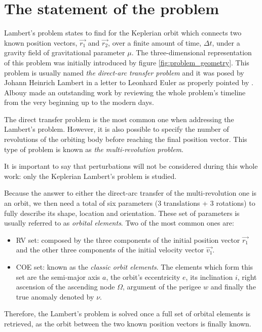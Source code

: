 \section{The statement of the problem}
\label{sec:statement}

Lambert's problem states to find for the Keplerian orbit which connects two
known position vectors, $\vec{r_{1}}$ and $\vec{r_{2}}$, over a finite amount of
time, $\Delta t$, under a gravity field of gravitational parameter $\mu$. The
three-dimensional representation of this problem was initially introduced by
figure \ref{fig:problem_geometry}. This problem is usually named \textit{the
  direct-arc transfer problem} and it was posed by Johann Heinrich Lambert in a
letter to Leonhard Euler as properly pointed by \cite{albouy2019}. Albouy made
an outstanding work by reviewing the whole problem's timeline from the very
beginning up to the modern days.

The direct transfer problem is the most common one when addressing the Lambert's
problem. However, it is also possible to specify the number of revolutions of
the orbiting body before reaching the final position vector. This type of
problem is known as \textit{the multi-revolution problem}.

It is important to say that perturbations will not be considered during this
whole work: only the Keplerian Lambert's problem is studied.

Because the answer to either the direct-arc transfer of the multi-revolution one
is an orbit, we then need a total of six parameters (3 translations + 3
rotations) to fully describe its shape, location and orientation. These set of
parameters is usually referred to as \textit{orbital elements}. Two of the most
common ones are:

\begin{itemize}
  \item RV set: composed by the three components of the initial position
        vector $\vec{r_{1}}$ and the other three components of the
        initial velocity vector $\vec{v_{1}}$.
  \item COE set: known as the \textit{classic orbit elements}. The
        elements which form this set are the semi-major axis $a$, the
        orbit's eccentricity $e$, its inclination $i$, right ascension
        of the ascending node $\Omega$, argument of the perigee $w$ and
        finally the true anomaly denoted by $\nu$.
\end{itemize}

Therefore, the Lambert's problem is solved once a full set of orbital elements
is retrieved, as the orbit between the two known position vectors is finally
known.
